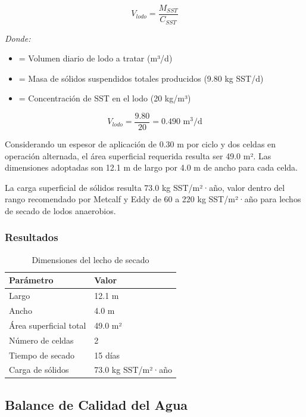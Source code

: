 \documentclass[12pt,a4paper]{article}
\begin{document}
\begin{equation}
V_{lodo} = \frac{M_{SST}}{C_{SST}}
\end{equation}

\textit{Donde:}
\begin{itemize}[noitemsep,leftmargin=2em]
    \item[$V_{lodo}$] = Volumen diario de lodo a tratar (m³/d)
    \item[$M_{SST}$] = Masa de sólidos suspendidos totales producidos (9.80 kg SST/d)
    \item[$C_{SST}$] = Concentración de SST en el lodo (20 kg/m³)
\end{itemize}

\begin{equation}
V_{lodo} = \frac{9.80}{20} = 0.490 \text{ m}^3\text{/d}
\end{equation}

Considerando un espesor de aplicación de 0.30 m por ciclo y dos celdas en operación alternada, el área superficial requerida resulta ser 49.0 m². Las dimensiones adoptadas son 12.1 m de largo por 4.0 m de ancho para cada celda.

La carga superficial de sólidos resulta 73.0 kg SST/m²·año, valor dentro del rango recomendado por Metcalf y Eddy \cite{metcalf2014} de 60 a 220 kg SST/m²·año para lechos de secado de lodos anaerobios.

\subsubsection{Resultados}

\begin{table}[H]
\centering
\caption{Dimensiones del lecho de secado}
\begin{tabular}{ll}
\toprule
Parámetro & Valor \\
\midrule
Largo & 12.1 m \\
Ancho & 4.0 m \\
Área superficial total & 49.0 m² \\
Número de celdas & 2 \\
Tiempo de secado & 15 días \\
Carga de sólidos & 73.0 kg SST/m²·año \\
\bottomrule
\end{tabular}
\end{table}

\subsection{Balance de Calidad del Agua}
\end{document}
